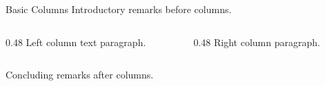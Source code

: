 \documentclass[14pt,t]{beamer}
\begin{document}
\begin{frame}{Basic Columns}
Introductory remarks before columns.

\begin{columns}[T]
\begin{column}{0.48\textwidth}
Left column text paragraph.
\end{column}
\begin{column}{0.48\textwidth}
Right column paragraph.
\end{column}
\end{columns}

Concluding remarks after columns.
\end{frame}
\end{document}

